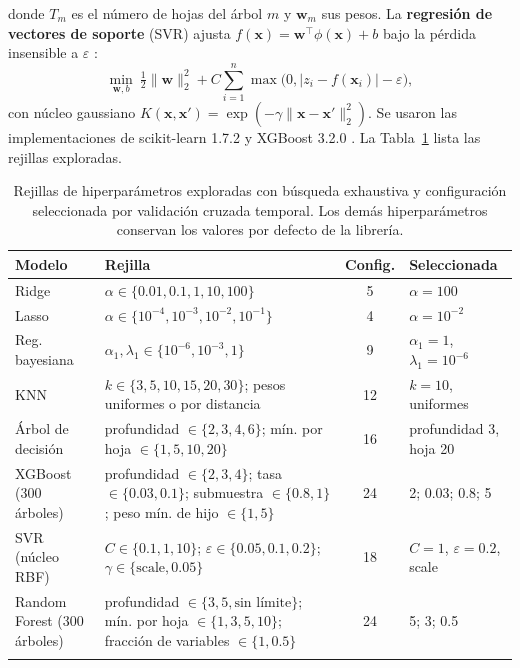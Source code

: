 \documentclass[pdflatex,sn-mathphys-num]{sn-jnl}
\begin{document}
donde $T_m$ es el número de hojas del árbol $m$ y $\mathbf{w}_m$ sus pesos. La \textbf{regresión de vectores de soporte} (SVR) ajusta $f(\mathbf{x})=\mathbf{w}^{\top}\phi(\mathbf{x})+b$ bajo la pérdida insensible a $\varepsilon$ \cite{drucker1997}:
\begin{equation}
\min_{\mathbf{w},b}\ \tfrac{1}{2}\lVert\mathbf{w}\rVert_2^2+C\sum_{i=1}^{n}\max\bigl(0,\lvert z_i-f(\mathbf{x}_i)\rvert-\varepsilon\bigr),
\label{eq:svr}
\end{equation}
con núcleo gaussiano $K(\mathbf{x},\mathbf{x}')=\exp(-\gamma\lVert\mathbf{x}-\mathbf{x}'\rVert_2^2)$. Se usaron las implementaciones de scikit-learn 1.7.2 \cite{pedregosa2011} y XGBoost 3.2.0 \cite{chen2016}. La Tabla~\ref{tab:rejillas} lista las rejillas exploradas.

\begin{table}[!htb]
\caption{Rejillas de hiperparámetros exploradas con búsqueda exhaustiva y configuración seleccionada por validación cruzada temporal. Los demás hiperparámetros conservan los valores por defecto de la librería.}\label{tab:rejillas}
\footnotesize
\begin{tabular*}{\textwidth}{@{\extracolsep\fill}p{}p{}cp{}}
\toprule
Modelo & Rejilla & Config. & Seleccionada \\
\midrule
Ridge & $\alpha\in\{0.01, 0.1, 1, 10, 100\}$ & 5 & $\alpha=100$ \\
Lasso & $\alpha\in\{10^{-4}, 10^{-3}, 10^{-2}, 10^{-1}\}$ & 4 & $\alpha=10^{-2}$ \\
Reg. bayesiana & $\alpha_1,\lambda_1\in\{10^{-6}, 10^{-3}, 1\}$ & 9 & $\alpha_1=1$, $\lambda_1=10^{-6}$ \\
KNN & $k\in\{3, 5, 10, 15, 20, 30\}$; pesos uniformes o por distancia & 12 & $k=10$, uniformes \\
Árbol de decisión & profundidad $\in\{2, 3, 4, 6\}$; mín. por hoja $\in\{1, 5, 10, 20\}$ & 16 & profundidad 3, hoja 20 \\
XGBoost (300 árboles) & profundidad $\in\{2, 3, 4\}$; tasa $\in\{0.03, 0.1\}$; submuestra $\in\{0.8, 1\}$; peso mín. de hijo $\in\{1, 5\}$ & 24 & 2; 0.03; 0.8; 5 \\
SVR (núcleo RBF) & $C\in\{0.1, 1, 10\}$; $\varepsilon\in\{0.05, 0.1, 0.2\}$; $\gamma\in\{\text{scale}, 0.05\}$ & 18 & $C=1$, $\varepsilon=0.2$, scale \\
Random Forest (300 árboles) & profundidad $\in\{3, 5, \text{sin límite}\}$; mín. por hoja $\in\{1, 3, 5, 10\}$; fracción de variables $\in\{1, 0.5\}$ & 24 & 5; 3; 0.5 \\
\botrule
\end{tabular*}
\end{table}
\end{document}
